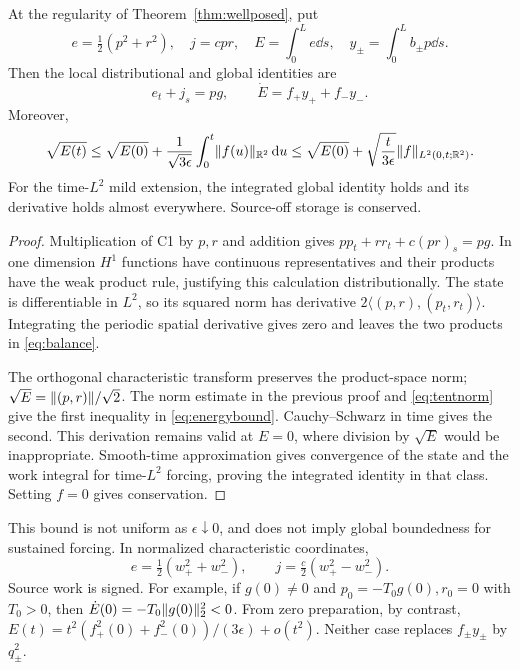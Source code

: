 \begin{theorem}\label{thm:work}
At the regularity of Theorem~\ref{thm:wellposed}, put
\begin{equation}\label{eq:account}
 e=\tfrac12(p^2+r^2),\quad j=cpr,\quad E=\int_0^L e\dd s,
 \quad y_\pm=\int_0^L b_\pm p\dd s.
\end{equation}
Then the local distributional and global identities are
\begin{equation}\label{eq:balance}
 e_t+j_s=pg,\qquad \dot E=f_+y_++f_-y_-.
\end{equation}
Moreover,
\begin{equation}\label{eq:energybound}
 \sqrt{E(t)}\le\sqrt{E(0)}+\frac1{\sqrt{3\epsilon}}\int_0^t\lVert f(u)\rVert_{\mathbb R^2}\,\mathrm d u
 \le\sqrt{E(0)}+\sqrt{\frac t{3\epsilon}}\lVert f\rVert_{L^2(0,t;\mathbb R^2)}.
\end{equation}
For the time-$L^2$ mild extension, the integrated global identity holds and its derivative holds almost everywhere. Source-off storage is conserved.
\end{theorem}
\begin{proof}
Multiplication of C1 by $p,r$ and addition gives $pp_t+rr_t+c(pr)_s=pg$. In one dimension $H^1$ functions have continuous representatives and their products have the weak product rule, justifying this calculation distributionally. The state is differentiable in $L^2$, so its squared norm has derivative $2\langle(p,r),(p_t,r_t)\rangle$. Integrating the periodic spatial derivative gives zero and leaves the two products in \eqref{eq:balance}.

The orthogonal characteristic transform preserves the product-space norm; $\sqrt E=\lVert(p,r)\rVert/\sqrt2$. The norm estimate in the previous proof and \eqref{eq:tentnorm} give the first inequality in \eqref{eq:energybound}. Cauchy--Schwarz in time gives the second. This derivation remains valid at $E=0$, where division by $\sqrt E$ would be inappropriate. Smooth-time approximation gives convergence of the state and the work integral for time-$L^2$ forcing, proving the integrated identity in that class. Setting $f=0$ gives conservation.
\end{proof}

This bound is not uniform as $\epsilon\downarrow0$, and does not imply global boundedness for sustained forcing. In normalized characteristic coordinates,
\begin{equation}\label{eq:characteristicaccount}
 e=\tfrac12(w_+^2+w_-^2),\qquad j=\tfrac c2(w_+^2-w_-^2).
\end{equation}
Source work is signed. For example, if $g(0)\ne0$ and $p_0=-T_0g(0),r_0=0$ with $T_0>0$, then $\dot E(0)=-T_0\lVert g(0)\rVert_2^2<0$. From zero preparation, by contrast, $E(t)=t^2(f_+^2(0)+f_-^2(0))/(3\epsilon)+o(t^2)$. Neither case replaces $f_\pm y_\pm$ by $q_\pm^2$.

